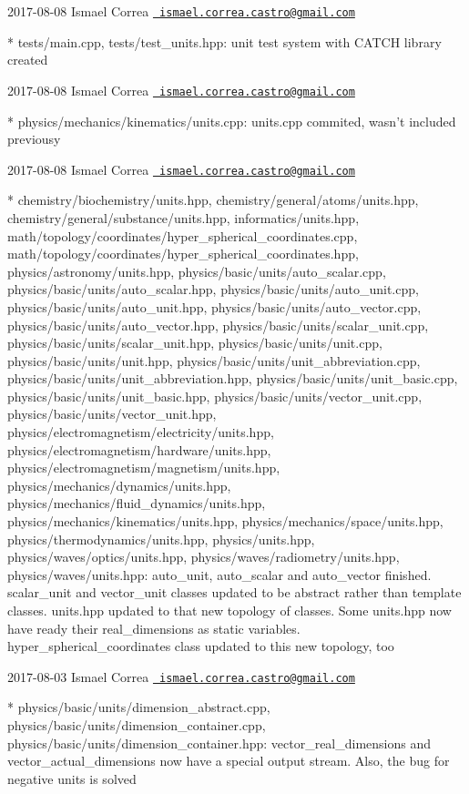  2017-\/08-\/08 Ismael Correa \href{mailto:ismael.correa.castro@gmail.com}{\texttt{ ismael.\+correa.\+castro@gmail.\+com}} \begin{DoxyVerb}* tests/main.cpp, tests/test_units.hpp: unit test system with CATCH
library created
\end{DoxyVerb}
 2017-\/08-\/08 Ismael Correa \href{mailto:ismael.correa.castro@gmail.com}{\texttt{ ismael.\+correa.\+castro@gmail.\+com}} \begin{DoxyVerb}* physics/mechanics/kinematics/units.cpp: units.cpp commited, wasn't
included previousy
\end{DoxyVerb}
 2017-\/08-\/08 Ismael Correa \href{mailto:ismael.correa.castro@gmail.com}{\texttt{ ismael.\+correa.\+castro@gmail.\+com}} \begin{DoxyVerb}* chemistry/biochemistry/units.hpp,
chemistry/general/atoms/units.hpp,
chemistry/general/substance/units.hpp, informatics/units.hpp,
math/topology/coordinates/hyper_spherical_coordinates.cpp,
math/topology/coordinates/hyper_spherical_coordinates.hpp,
physics/astronomy/units.hpp, physics/basic/units/auto_scalar.cpp,
physics/basic/units/auto_scalar.hpp,
physics/basic/units/auto_unit.cpp,
physics/basic/units/auto_unit.hpp,
physics/basic/units/auto_vector.cpp,
physics/basic/units/auto_vector.hpp,
physics/basic/units/scalar_unit.cpp,
physics/basic/units/scalar_unit.hpp, physics/basic/units/unit.cpp,
physics/basic/units/unit.hpp,
physics/basic/units/unit_abbreviation.cpp,
physics/basic/units/unit_abbreviation.hpp,
physics/basic/units/unit_basic.cpp,
physics/basic/units/unit_basic.hpp,
physics/basic/units/vector_unit.cpp,
physics/basic/units/vector_unit.hpp,
physics/electromagnetism/electricity/units.hpp,
physics/electromagnetism/hardware/units.hpp,
physics/electromagnetism/magnetism/units.hpp,
physics/mechanics/dynamics/units.hpp,
physics/mechanics/fluid_dynamics/units.hpp,
physics/mechanics/kinematics/units.hpp,
physics/mechanics/space/units.hpp,
physics/thermodynamics/units.hpp, physics/units.hpp,
physics/waves/optics/units.hpp, physics/waves/radiometry/units.hpp,
physics/waves/units.hpp: auto_unit, auto_scalar and auto_vector
finished. scalar_unit and vector_unit classes updated to be abstract
rather than template classes. units.hpp updated to that new topology
of classes. Some units.hpp now have ready their real_dimensions as
static variables. hyper_spherical_coordinates class updated to this
new topology, too
\end{DoxyVerb}
 2017-\/08-\/03 Ismael Correa \href{mailto:ismael.correa.castro@gmail.com}{\texttt{ ismael.\+correa.\+castro@gmail.\+com}} \begin{DoxyVerb}* physics/basic/units/dimension_abstract.cpp,
physics/basic/units/dimension_container.cpp,
physics/basic/units/dimension_container.hpp: vector_real_dimensions
and vector_actual_dimensions now have a special output stream. Also,
the bug for negative units is solved
\end{DoxyVerb}
